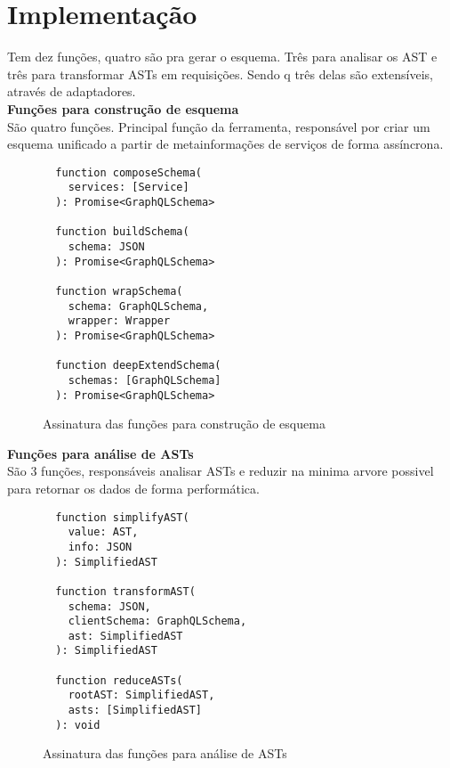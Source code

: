 \section{Implementação}

Tem dez funções, quatro são pra gerar o esquema. Três para analisar os AST e três para transformar ASTs em requisições. Sendo q três delas são extensíveis, através de adaptadores. \\

\textbf{Funções para construção de esquema} \\

São quatro funções. Principal função da ferramenta, responsável por criar um esquema unificado a partir de metainformações de serviços de forma assíncrona.

\begin{figure}[H]
  \centering
  \begin{verbatim}
  function composeSchema(
    services: [Service]
  ): Promise<GraphQLSchema>

  function buildSchema(
    schema: JSON
  ): Promise<GraphQLSchema>

  function wrapSchema(
    schema: GraphQLSchema, 
    wrapper: Wrapper
  ): Promise<GraphQLSchema>

  function deepExtendSchema(
    schemas: [GraphQLSchema]
  ): Promise<GraphQLSchema>
  \end{verbatim}
  \caption{Assinatura das funções para construção de esquema}
\end{figure}

\textbf{Funções para análise de ASTs} \\

São 3 funções, responsáveis analisar ASTs e reduzir na minima arvore possivel para retornar os dados de forma performática.

\begin{figure}[H]
  \centering
  \begin{verbatim}
  function simplifyAST(
    value: AST, 
    info: JSON
  ): SimplifiedAST

  function transformAST(
    schema: JSON,
    clientSchema: GraphQLSchema, 
    ast: SimplifiedAST
  ): SimplifiedAST

  function reduceASTs(
    rootAST: SimplifiedAST, 
    asts: [SimplifiedAST]
  ): void
  \end{verbatim}
  \caption{Assinatura das funções para análise de ASTs}
\end{figure}

